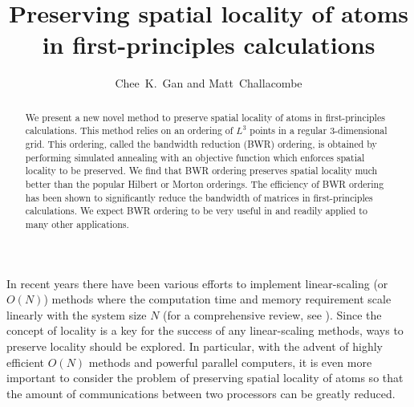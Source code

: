 \documentclass[preprint,showpacs,amssymb,aps]{revtex4}
\begin{document}
\title{
Preserving spatial locality of atoms in first-principles calculations}
\author{Chee~K.~Gan and Matt~Challacombe
}
 
\begin{abstract}
We present a new novel method to preserve spatial locality of atoms in
first-principles calculations. This method relies on an ordering 
of $L^3$ points in a regular 3-dimensional grid. This ordering, called 
the bandwidth reduction (BWR) ordering,
is obtained by performing simulated annealing with an objective
function which enforces
spatial locality to be preserved. We find that BWR ordering
preserves spatial locality much better than the popular Hilbert or Morton 
orderings. The efficiency of BWR ordering has been shown to 
significantly reduce the bandwidth of matrices in 
first-principles calculations. 
We expect BWR ordering 
to be very useful in and readily applied to many other applications. 
\end{abstract}
\maketitle
In recent years there have been various efforts to implement linear-scaling
(or $O(N)$) methods where the computation time and memory requirement scale
linearly with the system size $N$ (for a comprehensive review,
see \cite{Goedecker_99v71}). 
Since the concept of locality is a key for the success of any
linear-scaling methods\cite{Kohn_96v76},
ways to preserve locality should be explored. In particular, with the advent of
highly efficient $O(N)$ methods and 
powerful parallel computers, it is even more important to consider
the problem of preserving
spatial locality of atoms so that the amount of communications between
two processors can be greatly reduced.
\end{document}
